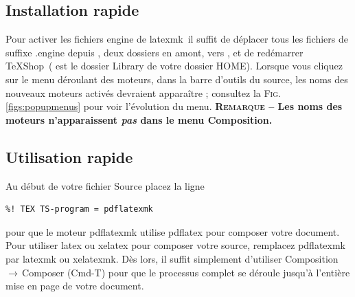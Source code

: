 \documentclass[11pt,french]{article}
\newcommand{\TS}{\textsf{\TeX Shop}}
\newcommand{\latexmk}{\textsf{latexmk}}
\newcommand{\mnu}[1]{\textsf{#1}}
\newcommand{\cmd}[1]{\textsf{#1}}
\newcommand{\To}{\,\(\to\)\,}
\begin{document}
\subsection{Installation rapide}

Pour activer les fichiers \cmd{engine} de \latexmk\ il suffit de déplacer tous les fichiers de suffixe \cmd{.engine}  depuis , deux dossiers en amont, vers , et de redémarrer \TS\ ( est le dossier \cmd{Library} de votre dossier \cmd{HOME}). Lorsque vous cliquez sur le menu déroulant des moteurs, dans la barre d'outils du source, les noms des nouveaux moteurs activés devraient apparaître ; consultez la \textsc{Fig.}\ref{figs:popupmenus} pour voir l'évolution du menu. \textbf{\textsc{Remarque} -- Les noms des moteurs n'apparaissent \emph{pas} dans le menu \mnu{Composition}.}
 
%

\subsection{Utilisation rapide}

Au début de votre fichier Source placez la ligne
\begin{verbatim}
%! TEX TS-program = pdflatexmk
\end{verbatim}
pour que le moteur \cmd{pdflatexmk} utilise \cmd{pdflatex} pour composer votre document. Pour utiliser \cmd{latex} ou \cmd{xelatex} pour composer votre source, remplacez \cmd{pdflatexmk} par \cmd{latexmk} ou \cmd{xelatexmk}. Dès lors, il suffit simplement d'utiliser \mnu{Composition}\To\mnu{Composer} (\cmd{Cmd-T}) pour que le processus complet se déroule jusqu'à l'entière mise en page de votre document. 
\end{document}
